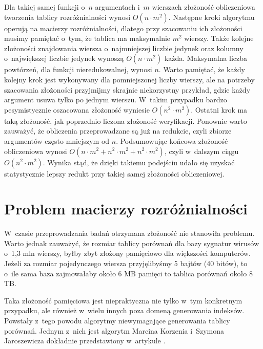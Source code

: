 Dla takiej samej funkcji o~$n$ argumentach i~$m$ wierszach złożoność obliczeniowa tworzenia tablicy rozróżnialności wynosi $O(n \cdot m^2)$.
Następne kroki algorytmu operują na macierzy rozróżnialności,
dlatego przy szacowaniu ich złożoności musimy pamiętać o~tym,
że tablica ma maksymalnie $m^2$ wierszy.
Także kolejne złożoności znajdowania wiersza o~najmniejszej liczbie jedynek oraz kolumny o~największej liczbie jedynek wynoszą $O(n \cdot m^2)$ każda.
Maksymalna liczba powtórzeń,
dla funkcji nieredukowalnej,
wynosi $n$.
Warto pamiętać,
że każdy kolejny krok jest wykonywany dla pomniejszonej liczby wierszy,
ale na potrzeby szacowania złożoności przyjmijmy skrajnie niekorzystny przykład,
gdzie każdy argument usuwa tylko po jednym wierszu.
W~takim przypadku bardzo pesymistycznie oszacowana złożoność wyniesie $O(n^2 \cdot m^2)$.
Ostatni krok ma taką złożoność,
jak poprzednio liczona złożoność weryfikacji.
Ponownie warto zauważyć,
że obliczenia przeprowadzane są już na redukcie,
czyli zbiorze argumentów często mniejszym od $n$.
Podsumowując końcowa złożoność obliczeniowa wynosi $O(n \cdot m^2 + n^2 \cdot m^2 + n^2 \cdot m^2)$,
czyli w~dalszym ciągu $O(n^2 \cdot m^2)$.
Wynika stąd,
że dzięki takiemu podejściu udało się uzyskać statystycznie lepszy redukt przy takiej samej złożoności obliczeniowej.


\section{Problem macierzy rozróżnialności}

W~czasie przeprowadzania badań otrzymana złożoność nie stanowiła problemu.
Warto jednak zauważyć,
że rozmiar tablicy porównań dla bazy sygnatur wirusów o~1,3 mln wierszy,
byłby zbyt złożony pamięciowo dla większości komputerów.
Jeżeli za rozmiar pojedynczego wiersza przyjęlibyśmy 5 bajtów (40 bitów), to o~ile sama baza zajmowałaby około 6 MB pamięci to tablica porównań około 8 TB.

Taka złożoność pamięciowa jest niepraktyczna nie tylko w~tym konkretnym przypadku,
ale również w~wielu innych poza domeną generowania indeksów.
Powstały z~tego powodu algorytmy niewymagające generowania tablicy porównań.
Jednym z~nich jest algorytm Marcina Korzenia i~Szymona Jaroszewicza dokładnie przedstawiony w~artykule \cite{without-matrix}.

